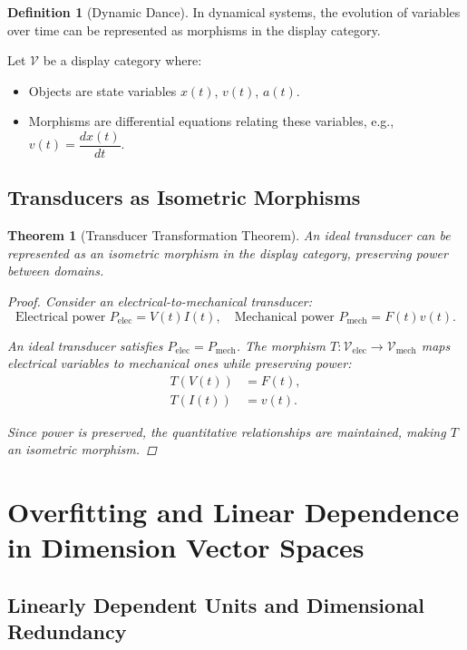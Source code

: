 \documentclass{article}
\newtheorem{theorem}{Theorem}[section]
\theoremstyle{definition}
\newtheorem{definition}{Definition}[section]
\theoremstyle{remark}
\begin{document}
	\begin{definition}[Dynamic Dance]
		In dynamical systems, the evolution of variables over time can be represented as morphisms in the display category.
		
		Let $\mathcal{V}$ be a display category where:
		\begin{itemize}
			\item Objects are state variables $x(t)$, $v(t)$, $a(t)$.
			\item Morphisms are differential equations relating these variables, e.g., $v(t) = \dfrac{dx(t)}{dt}$.
		\end{itemize}
	\end{definition}
	
	\subsection{Transducers as Isometric Morphisms}
	
	\begin{theorem}[Transducer Transformation Theorem]
		An ideal transducer can be represented as an isometric morphism in the display category, preserving power between domains.
		
		\begin{proof}
			Consider an electrical-to-mechanical transducer:
			\[
			\text{Electrical power } P_{\text{elec}} = V(t) I(t), \quad \text{Mechanical power } P_{\text{mech}} = F(t) v(t).
			\]
			
			An ideal transducer satisfies $P_{\text{elec}} = P_{\text{mech}}$. The morphism $T: \mathcal{V}_{\text{elec}} \rightarrow \mathcal{V}_{\text{mech}}$ maps electrical variables to mechanical ones while preserving power:
			\begin{align*}
				T(V(t)) &= F(t), \\
				T(I(t)) &= v(t).
			\end{align*}
			
			Since power is preserved, the quantitative relationships are maintained, making $T$ an isometric morphism.
		\end{proof}
	\end{theorem}
	
	\section{Overfitting and Linear Dependence in Dimension Vector Spaces}
	
	\subsection{Linearly Dependent Units and Dimensional Redundancy}
	
\end{document}
